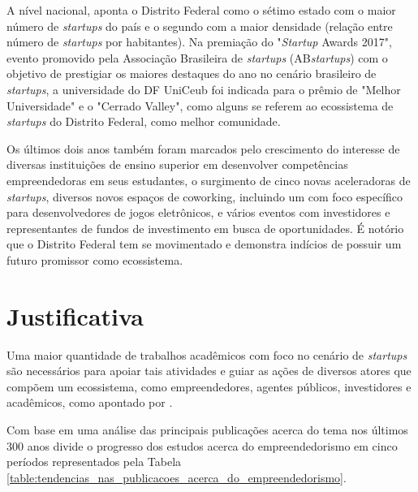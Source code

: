 A nível nacional,  aponta o Distrito Federal como o sétimo estado com o maior número de \textit{startups} do país e o segundo com a maior densidade (relação entre número de \textit{startups} por habitantes). Na premiação do "\textit{Startup} Awards 2017", evento promovido pela Associação Brasileira de \textit{startups} (AB\textit{startups}) com o objetivo de prestigiar os maiores destaques do ano no cenário brasileiro de \textit{startups}, a universidade do DF UniCeub foi indicada para o prêmio de "Melhor Universidade" e o "Cerrado Valley", como alguns se referem ao ecossistema de \textit{startups} do Distrito Federal, como melhor comunidade. 

Os últimos dois anos também foram marcados pelo crescimento do interesse de diversas instituições de ensino superior em desenvolver competências empreendedoras em seus estudantes, o surgimento de cinco novas aceleradoras de \textit{startups}, diversos novos espaços de coworking, incluindo um com foco específico para desenvolvedores de jogos eletrônicos, e vários eventos com investidores e representantes de fundos de investimento em busca de oportunidades. É notório que o Distrito Federal tem se movimentado e demonstra indícios de possuir um futuro promissor como ecossistema.

\section{Justificativa}
\label{section:justificativa}

Uma maior quantidade de trabalhos acadêmicos com foco no cenário de \textit{startups} são necessários para apoiar tais atividades e guiar as ações de diversos atores que compõem um ecossistema, como empreendedores, agentes públicos, investidores e acadêmicos, como apontado por .

Com base em uma análise das principais publicações acerca do tema nos últimos 300 anos  divide o progresso dos estudos acerca do empreendedorismo em cinco períodos representados pela Tabela \ref{table:tendencias_nas_publicacoes_acerca_do_empreendedorismo}.

